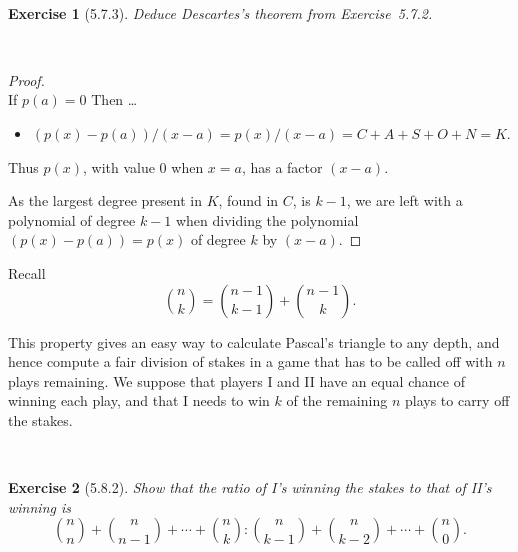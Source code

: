 \documentclass[12pt]{article}
\newcommand{\XB}{\color{black}}
\newcommand{\XBB}{\color{blue}}
\newcommand{\ds}{\displaystyle}
\theoremstyle{plain}
\newtheorem{ex}{Exercise}
\begin{document}
\newpage

\XBB\hrulefill\XB \\
\begin{ex} [5.7.3]
  Deduce Descartes's theorem from Exercise~5.7.2.
\end{ex}
\XBB\hrulefill\XB \\

\begin{proof}
  \ \\

  If $ p(a) = 0 $ Then \dots

  \begin{itemize}
    \item $ \ds (p(x) - p(a)) / (x - a) = p(x) / (x - a) = C + A + S + O + N = K $.
  \end{itemize}

  Thus $ p(x) $, with value $ 0 $ when $ x = a $, has a factor $ (x - a) $. 

  As the largest degree present in $ K $, found in $ C $, is $ k - 1 $, 
  we are left with a polynomial of degree $ k - 1 $ when dividing the polynomial $ (p(x) - p(a)) = p(x) $ of degree $ k $ by $ (x - a) $.
\end{proof}

\newpage

Recall
\[
  \binom{n}{k} = \binom{n - 1}{k - 1} + \binom{n - 1}{k}.
\]

This property gives an easy way to calculate Pascal's triangle to any depth, 
and hence compute a fair division of stakes in a game that has to be called off with $ n $ plays remaining. 
We suppose that players I and II have an equal chance of winning each play, 
and that I needs to win $ k $ of the remaining $ n $ plays to carry off the stakes.


\XBB\hrulefill\XB \\
\begin{ex} [5.8.2]
  Show that the ratio of I's winning the stakes to that of II's winning is
  \[
    \binom{n}{n} + \binom{n}{n - 1} + \cdots + \binom{n}{k} : \binom{n}{k - 1} + \binom{n}{k - 2} + \cdots + \binom{n}{0}.
  \]
\end{ex}
\XBB\hrulefill\XB \\
\end{document}
